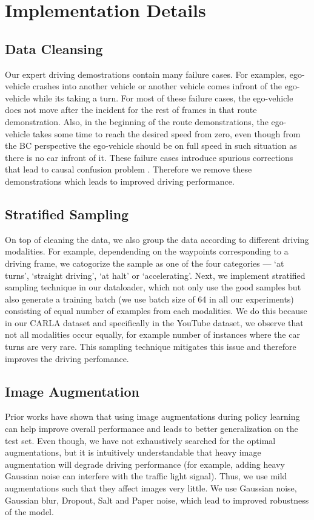 \documentclass[12pt, letterpaper,cleardoubleempty,BCOR1cm]{scrbook}
\begin{document}
\section{Implementation Details}
\label{sec:org201f9a4}
\subsection{Data Cleansing}
\label{sec:orge664fe6}
Our expert driving demostrations contain many failure cases. For examples,
ego-vehicle crashes into another vehicle or another vehicle comes infront of the
ego-vehicle while its taking a turn. For most of these failure cases, the
ego-vehicle does not move after the incident for the rest of frames in that
route demonstration. Also, in the beginning of the route demonstrations, the
ego-vehicle takes some time to reach the desired speed from zero, even though
from the BC perspective the ego-vehicle should be on full speed in such
situation as there is no car infront of it. These failure cases introduce
spurious corrections that lead to causal confusion problem
\cite{Codevilla2019}. Therefore we remove these demonstrations which leads to
improved driving performance.

\subsection{Stratified Sampling}
\label{sec:orgdd1802e}
On top of cleaning the data, we also group the data according to different
driving modalities. For example, dependending on the waypoints corresponding to
a driving frame, we catogorize the sample as one of the four categories --- `at
turns', `straight driving', `at halt' or `accelerating'. Next, we implement
stratified sampling technique in our dataloader, which not only use the good
samples but also generate a training batch (we use batch size of 64 in all our
experiments) consisting of equal number of examples from each modalities. We do
this because in our CARLA dataset and specifically in the YouTube dataset, we
observe that not all modalities occur equally, for example number of instances
where the car turns are very rare. This sampling technique mitigates this issue
and therefore improves the driving perfomance.

\subsection{Image Augmentation}
\label{sec:org0284d03}
Prior works \cite{Laskin2020,Kostrikov2020,Yarats2021,Mezghani2021} have shown
that using image augmentations during policy learning can help improve overall
performance and leads to better generalization on the test set. Even though, we
have not exhaustively searched for the optimal augmentations, but it is
intuitively understandable that heavy image augmentation will degrade driving
performance (for example, adding heavy Gaussian noise can interfere with the
traffic light signal). Thus, we use mild augmentations such that they affect
images very little. We use Gaussian noise, Gaussian blur, Dropout, Salt and
Paper noise, which lead to improved robustness of the model.
\end{document}
